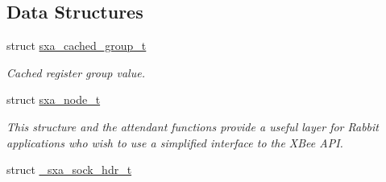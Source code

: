\subsection*{Data Structures}
\begin{DoxyCompactItemize}
\item 
struct \hyperlink{structsxa__cached__group__t}{sxa\+\_\+cached\+\_\+group\+\_\+t}
\begin{DoxyCompactList}\small\item\em Cached register group value. \end{DoxyCompactList}\item 
struct \hyperlink{structsxa__node__t}{sxa\+\_\+node\+\_\+t}
\begin{DoxyCompactList}\small\item\em This structure and the attendant functions provide a useful layer for Rabbit applications who wish to use a simplified interface to the X\+Bee A\+PI. \end{DoxyCompactList}\item 
struct \hyperlink{struct__sxa__sock__hdr__t}{\+\_\+sxa\+\_\+sock\+\_\+hdr\+\_\+t}
\end{DoxyCompactItemize}
